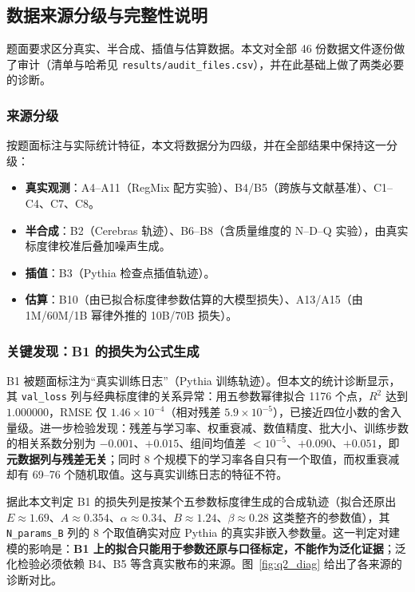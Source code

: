 \subsection{数据来源分级与完整性说明}
\label{sec:data_integrity}

题面要求区分真实、半合成、插值与估算数据。本文对全部 46 份数据文件逐份做了审计（清单与哈希见 \texttt{results/audit\_files.csv}），并在此基础上做了两类必要的诊断。

\subsubsection{来源分级}

按题面标注与实际统计特征，本文将数据分为四级，并在全部结果中保持这一分级：

\begin{itemize}[leftmargin=2em,itemsep=2pt]
\item \textbf{真实观测}：A4--A11（RegMix 配方实验）、B4/B5（跨族与文献基准）、C1--C4、C7、C8。
\item \textbf{半合成}：B2（Cerebras 轨迹）、B6--B8（含质量维度的 N--D--Q 实验），由真实标度律校准后叠加噪声生成。
\item \textbf{插值}：B3（Pythia 检查点插值轨迹）。
\item \textbf{估算}：B10（由已拟合标度律参数估算的大模型损失）、A13/A15（由 1M/60M/1B 幂律外推的 10B/70B 损失）。
\end{itemize}

\subsubsection{关键发现：B1 的损失为公式生成}
\label{sec:b1_synthetic}

B1 被题面标注为``真实训练日志''（Pythia 训练轨迹）。但本文的统计诊断显示，其 \texttt{val\_loss} 列与经典标度律的关系异常：用五参数幂律拟合 1176 个点，$R^2$ 达到 $1.000000$，RMSE 仅 $1.46\times10^{-4}$（相对残差 $5.9\times10^{-5}$），已接近四位小数的舍入量级。进一步检验发现：残差与学习率、权重衰减、数值精度、批大小、训练步数的相关系数分别为 $-0.001$、$+0.015$、组间均值差 $<10^{-5}$、$+0.090$、$+0.051$，即\textbf{元数据列与残差无关}；同时 8 个规模下的学习率各自只有一个取值，而权重衰减却有 69--76 个随机取值。这与真实训练日志的特征不符。

据此本文判定 B1 的损失列是按某个五参数标度律生成的合成轨迹（拟合还原出 $E\approx1.69$、$A\approx0.354$、$\alpha\approx0.34$、$B\approx1.24$、$\beta\approx0.28$ 这类整齐的参数值），其 \texttt{N\_params\_B} 列的 8 个取值确实对应 Pythia 的真实非嵌入参数量。这一判定对建模的影响是：\textbf{B1 上的拟合只能用于参数还原与口径标定，不能作为泛化证据}；泛化检验必须依赖 B4、B5 等含真实散布的来源。图~\ref{fig:q2_diag} 给出了各来源的诊断对比。

